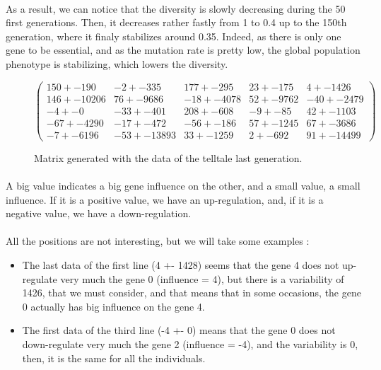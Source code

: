 \documentclass[]{report} %
\begin{document}
    \paragraph*{}
    As a result, we can notice that the diversity is slowly decreasing during the 50 first generations. Then, it decreases rather fastly from 1 to 0.4 up to the 150th generation, where it finaly stabilizes around 0.35. Indeed, as there is only one gene to be essential, and as the mutation rate is pretty low, the global population phenotype is stabilizing, which lowers the diversity.

    \begin{figure}[H] 
            \centering
            \small
    $
            \begin{pmatrix}
                150 +- 190 & -2 +- 335 & 177 +- 295 & 23 +- 175 & 4 +- 1426 \\
                146 +- 10206 & 76 +- 9686 & -18 +- 4078 & 52 +- 9762 & -40 +- 2479 \\
                -4 +- 0 & -33 +- 401 & 208 +- 608 & -9 +- 85 & 42 +- 1103 \\
                -67 +- 4290 & -17 +- 472 & -56 +- 186 & 57 +- 1245 & 67 +- 3686 \\
                -7 +- 6196 & -53 +- 13893 & 33 +- 1259 & 2 +- 692 & 91 +- 1449 9 
            \end{pmatrix}
    $
            \caption{\footnotesize Matrix generated with the data of the telltale last generation.}
            \label{mat:telltale}
    \end{figure}
    \paragraph*{}
    A big value indicates a big gene influence on the other, and a small value, a small influence. If it is a positive value, we have an up-regulation, and, if it is a negative value, we have a down-regulation.
    \paragraph*{}
    All the positions are not interesting, but we will take some examples :
    \begin{itemize}
        \item The last data of the first line (4 +- 1428) seems that the gene 4 does not up-regulate very much the gene 0 (influence = 4), but there is a variability of 1426, that we must consider, and that means that in some occasions, the gene 0 actually has big influence on the gene 4.
        \item The first data of the third line (-4 +- 0) means that the gene 0 does not down-regulate very much the gene 2 (influence = -4), and the variability is 0, then, it is the same for all the individuals.
    \end{itemize}
\end{document}
